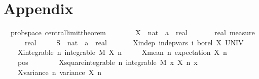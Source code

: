 \documentclass{svjour3}
\begin{document}
\section*{Appendix}

{
\scriptsize
\begin{isabellebody}
\isamarkupfalse%
\ {\isacharparenleft}\ prob{\isacharunderscore}space{\isacharparenright}\ central{\isacharunderscore}limit{\isacharunderscore}theorem{\isacharcolon}\isanewline
\ \ \ \isanewline
\ \ \ \ X\ {\isacharcolon}{\isacharcolon}\ {\isachardoublequoteopen}nat\ {\isasymRightarrow}\ {\isacharprime}a\ {\isasymRightarrow}\ real{\isachardoublequoteclose}\ \isanewline
\ \ \ \ {\isasymmu}\ {\isacharcolon}{\isacharcolon}\ {\isachardoublequoteopen}real\ measure{\isachardoublequoteclose}\ \isanewline
\ \ \ \ {\isasymsigma}\ {\isacharcolon}{\isacharcolon}\ real\ \isanewline
\ \ \ \ S\ {\isacharcolon}{\isacharcolon}\ {\isachardoublequoteopen}nat\ {\isasymRightarrow}\ {\isacharprime}a\ {\isasymRightarrow}\ real{\isachardoublequoteclose}\isanewline
\ \ \isanewline
\ \ \ \ X{\isacharunderscore}indep{\isacharcolon}\ {\isachardoublequoteopen}indep{\isacharunderscore}vars\ {\isacharparenleft}{\isasymlambda}i{\isachardot}\ borel{\isacharparenright}\ X\ UNIV{\isachardoublequoteclose}\ \isanewline
\ \ \ \ X{\isacharunderscore}integrable{\isacharcolon}\ {\isachardoublequoteopen}{\isasymAnd}n{\isachardot}\ integrable\ M\ {\isacharparenleft}X\ n{\isacharparenright}{\isachardoublequoteclose}\ \isanewline
\ \ \ \ X{\isacharunderscore}mean{\isacharunderscore}{}{\isacharcolon}\ {\isachardoublequoteopen}{\isasymAnd}n{\isachardot}\ expectation\ {\isacharparenleft}X\ n{\isacharparenright}\ {\isacharequal}\ {}{\isachardoublequoteclose}\ \isanewline
\ \ \ \ {\isasymsigma}{\isacharunderscore}pos{\isacharcolon}\ {\isachardoublequoteopen}{\isasymsigma}\ {\isachargreater}\ {}{\isachardoublequoteclose}\ \isanewline
\ \ \ \ X{\isacharunderscore}square{\isacharunderscore}integrable{\isacharcolon}\ {\isachardoublequoteopen}{\isasymAnd}n{\isachardot}\ integrable\ M\ {\isacharparenleft}{\isasymlambda}x{\isachardot}\ {\isacharparenleft}X\ n\ x{\isacharparenright}\ \isanewline
\ \ \ \ X{\isacharunderscore}variance{\isacharcolon}\ {\isachardoublequoteopen}{\isasymAnd}n{\isachardot}\ variance\ {\isacharparenleft}X\ n{\isacharparenright}\ {\isacharequal}\ {\isasymsigma}\ \isanewline

\end{isabellebody}}
\end{document}
